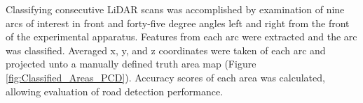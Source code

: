 \documentclass[journal,onecolumn]{IEEEtran}
\begin{document}
	
	

	{Classifying consecutive LiDAR scans was accomplished by examination of nine arcs of interest in front and forty-five degree angles left and right from the front of the experimental apparatus. Features from each arc were extracted and the arc was classified. Averaged x, y, and z coordinates were taken of each arc and projected unto a manually defined truth area map (Figure \ref{fig:Classified_Areas_PCD}). Accuracy scores of each area was calculated, allowing evaluation of road detection performance.}
	
	
\end{document}

